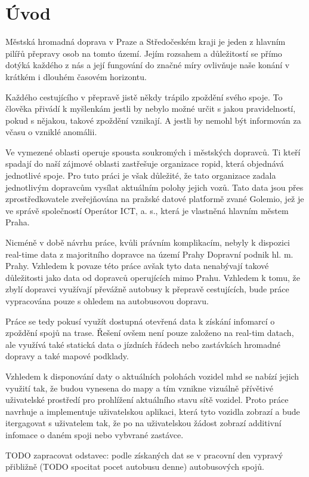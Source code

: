 \chapter*{Úvod}

Městská hromadná doprava v Praze a Středočeském kraji je jeden z hlavním pilířů přepravy osob na tomto území. Jejím rozsahem a důležitostí se přímo dotýká každého z nás a její fungování do značné míry ovlivňuje naše konání v krátkém i dlouhém časovém horizontu.

\bigbreak

Každého cestujícího v přepravě jistě někdy trápilo zpoždění svého spoje. To člověka přivádí k myšlenkám jestli by nebylo možné určit s jakou pravidelností, pokud s nějakou, takové zpoždění vznikají. A jestli by nemohl být informován za včasu o vzniklé anomálii.

\bigbreak

Ve vymezené oblasti operuje spousta soukromých i městských dopravců. Ti kteří spadají do naší zájmové oblasti zastřešuje organizace \gls{ropid}, která objednává jednotlivé spoje. Pro tuto práci je však důležité, že tato organizace zadala jednotlivým dopravcům vysílat aktuálním polohy jejich vozů. Tato data jsou přes zprostředkovatele zveřejňována na pražské datové platformě zvané Golemio, jež je ve správě společností Operátor ICT, a. s., která je vlastněná hlavním městem Praha.

\bigbreak

Nicméně v době návrhu práce, kvůli právním komplikacím, nebyly k dispozici real-time data z majoritního dopravce na území Prahy Dopravní podnik hl. m. Prahy. Vzhledem k povaze této práce avšak tyto data nenabývají takové důležitosti jako data od dopravců operujících mimo Prahu. Vzhledem k tomu, že zbylí dopravci využívají převážně autobusy k přepravě cestujících, bude práce vypracována pouze s ohledem na autobusovou dopravu.

\bigbreak

Práce se tedy pokusí využít dostupná otevřená data k získání infomarcí o zpoždění spojů na trase. Řešení ovšem není pouze založeno na real-tim datach, ale využívá také statická data o jízdních řádech nebo zastávkách hromadné dopravy a také mapové podklady.

\bigbreak

Vzhledem k disponování daty o aktuálních polohách vozidel \gls{mhd} se nabízí jejich využití tak, že budou vynesena do mapy a tím vznikne vizuálně přívětivé uživatelské prostředí pro prohlížení aktuálního stavu sítě vozidel. Proto práce navrhuje a implementuje uživatelskou aplikaci, která tyto vozidla zobrazí a bude itergagovat s uživatelem tak, že po na uživatelskou žádost zobrazí additivní infomace o daném spoji nebo vybvrané zastávce.


TODO zapracovat odstavec: podle získaných dat se v pracovní den vypravý přibližně (TODO spocitat pocet autobusu denne) autobusových spojů.
